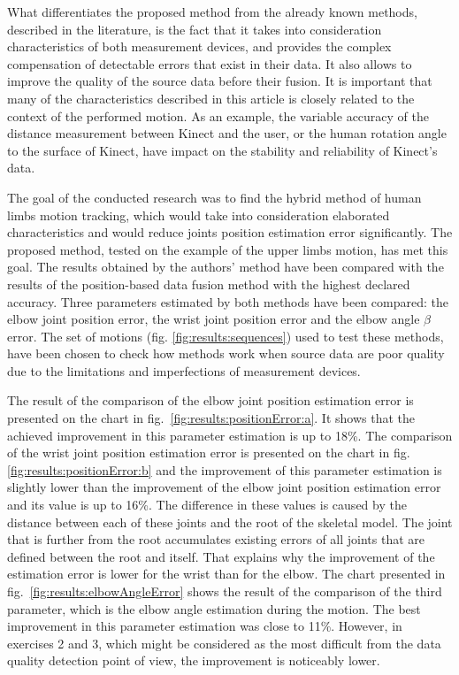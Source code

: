 \documentclass[sensors,article,submit,moreauthors,pdftex,10pt,a4paper]{mdpi}
\begin{document}
	What differentiates the proposed method from the already known methods, described in the literature, is the fact that it takes into consideration characteristics of both measurement devices, and provides the complex compensation of detectable errors that exist in their data. It also allows to improve the quality of the source data before their fusion. It is important that many of the characteristics described in this article is closely related to the context of the performed motion. As an example, the variable accuracy of the distance measurement between Kinect and the user, or the human rotation angle to the surface of Kinect, have impact on the stability and reliability of Kinect's data.
	
	The goal of the conducted research was to find the hybrid method of human limbs motion tracking, which would take into consideration elaborated characteristics and would reduce joints position estimation error significantly. The proposed method, tested on the example of the upper limbs motion, has met this goal. The results obtained by the authors' method have been compared with the results of the position-based data fusion method with the highest declared accuracy. Three parameters estimated by both methods have been compared: the elbow joint position error, the wrist joint position error and the elbow angle $\beta$ error. The set of motions (fig. \ref{fig:results:sequences}) used to test these methods, have been chosen to check how methods work when source data are poor quality due to the limitations and imperfections of measurement devices.
	
	The result of the comparison of the elbow joint position estimation error is presented on the chart in fig.~\ref{fig:results:positionError:a}. It shows that the achieved improvement in this parameter estimation is up to 18\%. The comparison of the wrist joint position estimation error is presented on the chart in fig. \ref{fig:results:positionError:b} and the improvement of this parameter estimation is slightly lower than the improvement of the elbow joint position estimation error and its value is up to 16\%. The difference in these values is caused by the distance between each of these joints and the root of the skeletal model. The joint that is further from the root accumulates existing errors of all joints that are defined between the root and itself. That explains why the improvement of the estimation error is lower for the wrist than for the elbow. The chart presented in fig.~\ref{fig:results:elbowAngleError} shows the result of the comparison of the third parameter, which is the elbow angle estimation during the motion. The best improvement in this parameter estimation was close to 11\%. However, in exercises 2 and 3, which might be considered as the most difficult from the data quality detection point of view, the improvement is noticeably lower.
	
\end{document}

